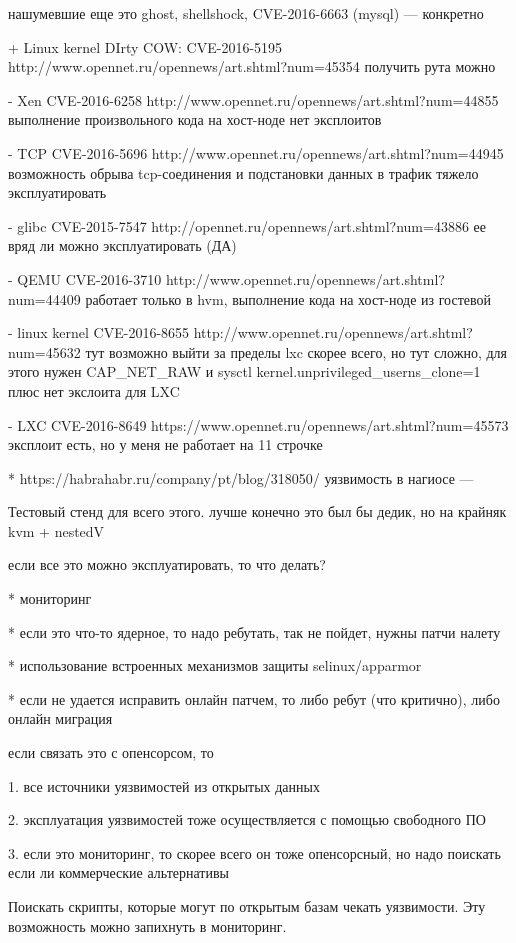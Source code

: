 нашумевшие еще это ghost, shellshock, CVE-2016-6663 (mysql)
--- конкретно

+ Linux kernel DIrty COW: CVE-2016-5195 http://www.opennet.ru/opennews/art.shtml?num=45354
получить рута можно

- Xen CVE-2016-6258 http://www.opennet.ru/opennews/art.shtml?num=44855
выполнение произвольного кода на хост-ноде
нет эксплоитов

- TCP CVE-2016-5696 http://www.opennet.ru/opennews/art.shtml?num=44945
возможность обрыва tcp-соединения и подстановки данных в трафик
тяжело эксплуатировать

- glibc CVE-2015-7547 http://opennet.ru/opennews/art.shtml?num=43886
ее вряд ли можно эксплуатировать (ДА)

- QEMU CVE-2016-3710 http://www.opennet.ru/opennews/art.shtml?num=44409
работает только в hvm, выполнение кода на хост-ноде из гостевой

- linux kernel CVE-2016-8655 http://www.opennet.ru/opennews/art.shtml?num=45632
тут возможно выйти за пределы lxc скорее всего, но тут сложно, для этого нужен CAP\_NET\_RAW и sysctl kernel.unprivileged\_userns\_clone=1 плюс нет экслоита для LXC

- LXC CVE-2016-8649 https://www.opennet.ru/opennews/art.shtml?num=45573
эксплоит есть, но у меня не работает на 11 строчке

* https://habrahabr.ru/company/pt/blog/318050/ уязвимость в нагиосе
---

Тестовый стенд для всего этого.
лучше конечно это был бы дедик, но на крайняк kvm + nestedV

если все это можно эксплуатировать, то что делать?

* мониторинг

* если это что-то ядерное, то надо ребутать, так не пойдет, нужны патчи налету

* использование встроенных механизмов защиты selinux/apparmor

* если не удается исправить онлайн патчем, то либо ребут (что критично), либо онлайн миграция


если связать это с опенсорсом, то

1. все источники уязвимостей из открытых данных

2. эксплуатация уязвимостей тоже осуществляется с помощью свободного ПО

3. если это мониторинг, то скорее всего он тоже опенсорсный, но надо поискать если ли коммерческие альтернативы

Поискать скрипты, которые могут по открытым базам чекать уязвимости.
Эту возможность можно запихнуть в мониторинг.


